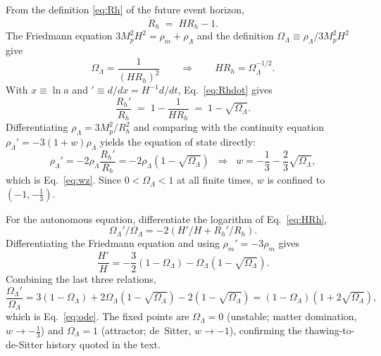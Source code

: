 \documentclass[11pt,a4paper]{article}
\begin{document}
From the definition \eqref{eq:Rh} of the future event horizon,
\begin{equation}
\dot R_h \;=\; H R_h - 1 .
\label{eq:Rhdot}
\end{equation}
The Friedmann equation $3M_p^2H^2 = \rho_m + \rho_\Lambda$ and the
definition $\Omega_\Lambda \equiv \rho_\Lambda/3M_p^2H^2$ give
\begin{equation}
\Omega_\Lambda = \frac{1}{(H R_h)^2}
\qquad\Longrightarrow\qquad
H R_h = \Omega_\Lambda^{-1/2}.
\label{eq:HRh}
\end{equation}
With $x \equiv \ln a$ and $'\equiv d/dx = H^{-1}d/dt$,
Eq.~\eqref{eq:Rhdot} gives
\begin{equation}
\frac{R_h'}{R_h} \;=\; 1 - \frac{1}{HR_h} \;=\; 1 - \sqrt{\Omega_\Lambda}.
\label{eq:Rhprime}
\end{equation}
Differentiating $\rho_\Lambda = 3M_p^2/R_h^2$ and comparing with the
continuity equation $\rho_\Lambda' = -3(1+w)\rho_\Lambda$ yields the
equation of state directly:
\begin{equation}
\rho_\Lambda' = -2\rho_\Lambda\frac{R_h'}{R_h}
= -2\rho_\Lambda\left(1-\sqrt{\Omega_\Lambda}\right)
\;\;\Longrightarrow\;\;
w = -\frac13 - \frac23\sqrt{\Omega_\Lambda},
\end{equation}
which is Eq.~\eqref{eq:wz}. Since $0<\Omega_\Lambda<1$ at all finite times,
$w$ is confined to $(-1,-\tfrac13)$.

For the autonomous equation, differentiate the logarithm of
Eq.~\eqref{eq:HRh},
\[
\Omega_\Lambda'/\Omega_\Lambda = -2\left(H'/H + R_h'/R_h\right).
\]
Differentiating the Friedmann equation and using
$\rho_m' = -3\rho_m$ gives
\begin{equation}
\frac{H'}{H} = -\frac32\left(1-\Omega_\Lambda\right)
- \Omega_\Lambda\left(1-\sqrt{\Omega_\Lambda}\right).
\end{equation}
Combining the last three relations,
\begin{equation}
\frac{\Omega_\Lambda'}{\Omega_\Lambda}
= 3(1-\Omega_\Lambda) + 2\Omega_\Lambda(1-\sqrt{\Omega_\Lambda})
- 2(1-\sqrt{\Omega_\Lambda})
= (1-\Omega_\Lambda)\left(1+2\sqrt{\Omega_\Lambda}\right),
\end{equation}
which is Eq.~\eqref{eq:ode}. The fixed points are
$\Omega_\Lambda=0$ (unstable; matter domination, $w\to-\tfrac13$) and
$\Omega_\Lambda=1$ (attractor; de~Sitter, $w\to-1$), confirming the
thawing-to-de-Sitter history quoted in the text.
\end{document}
